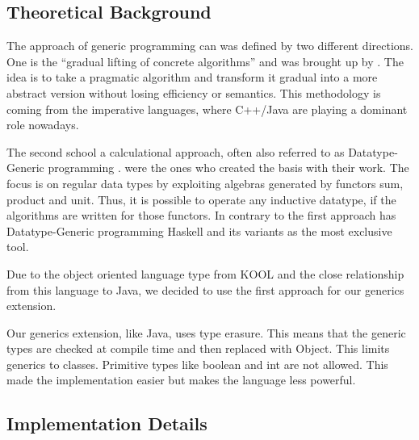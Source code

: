 
\subsection{Theoretical Background}
The approach of generic programming can was defined by two different directions. One is the “gradual lifting of concrete algorithms” \cite{Reis:2005} and was brought up by \citep{Musser:1988}. The idea is to take a pragmatic algorithm and transform it gradual into a more abstract version without losing efficiency or semantics. This methodology is coming from the imperative languages, where C++/Java are playing a dominant role nowadays.

The second school a calculational approach, often also referred to as Datatype-Generic programming \cite{Gibbons:2006}. \citep{Bird:1998} were the ones who created the basis with their work. The focus is on regular data types by exploiting algebras generated by functors sum, product and unit. Thus, it is possible to operate any inductive datatype, if the algorithms are written for those functors.  In contrary to the first approach has Datatype-Generic programming Haskell and its variants as the most exclusive tool.

Due to the object oriented language type from KOOL and the close relationship from this language to Java, we decided to use the first approach for our generics extension.

Our generics extension, like Java, uses type erasure. This means that the generic types are checked at compile time and then replaced with Object. This limits generics to classes. Primitive types like boolean and int are not allowed. This made the implementation easier but makes the language less powerful.

\subsection{Implementation Details}

